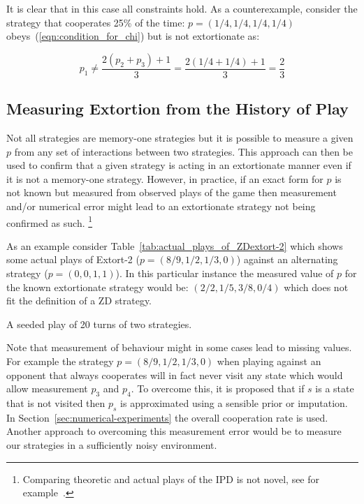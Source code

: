 \documentclass[a4paper]{article}
\begin{document}
It is clear that in this case all constraints hold. As a counterexample,
consider the strategy that cooperates 25\% of the time: \(p=(1 /4, 1 / 4, 1 / 4,
1 / 4)\) obeys~(\ref{eqn:condition_for_chi}) but is not extortionate as:

\begin{equation}
    p_1 \ne \frac{2(p_2 + p_3) + 1}{3}
        = \frac{2(1 / 4 + 1 / 4) + 1}{3}
        = \frac{2}{3}
\end{equation}

\subsection{Measuring Extortion from the History of Play}

Not all strategies are memory-one strategies but it is possible to
measure a given \(p\) from any set of interactions between two strategies.
This approach can then be used to confirm that a given strategy is acting
in an extortionate manner even if it is not a memory-one strategy. However, in
practice, if an exact form for \(p\) is not known but measured from observed
plays of the game then measurement and/or numerical error might lead to an
extortionate strategy not being confirmed as such. \footnote{Comparing theoretic
and actual plays of the IPD is not novel, see for example~\cite{Rand2013}.}


As an example consider Table~\ref{tab:actual_plays_of_ZDextort-2} which shows
some actual plays of Extort-2 (\(p=(8 / 9, 1 / 2, 1 / 3, 0)\)) against an
alternating strategy (\(p=(0, 0, 1, 1)\)). In this particular instance the
measured value of \(p\) for the known extortionate strategy would be:
\((2/2, 1/5, 3/8, 0/4)\) which does not fit the definition of a ZD strategy.


\begin{table}[!hbtp]
    
    \caption{A seeded play of 20 turns of two strategies.}
    \label{tab:actual_plays_of_ZDextort-2}
\end{table}


Note that measurement of behaviour might in some cases lead to missing values.
For example the strategy \(p=(8 / 9, 1 / 2, 1 / 3, 0)\) when playing against an
opponent that always cooperates will in fact never visit any state which would allow measurement
\(p_3\) and \(p_4\). To overcome this, it is proposed that if \(s\) is a state
that is not visited then \(p_s\) is approximated using a sensible prior or
imputation. In Section~\ref{sec:numerical-experiments} the overall cooperation
rate is used. Another approach to overcoming this measurement error would be to
measure our strategies in a sufficiently noisy environment.
\end{document}
